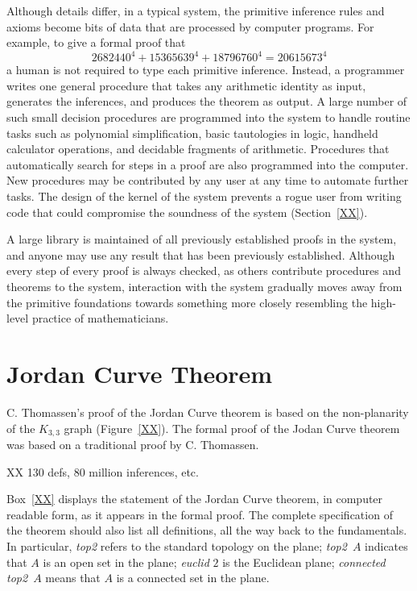 \documentclass{llncs}
\begin{document}
Although details differ, 
in a typical system, the primitive inference rules and axioms
become bits of data that are processed by computer programs.
For example, to give a formal proof that 
$$
2682440^4 + 15365639^4 + 18796760^4 = 20615673^4
$$
a human is not required to type each primitive inference.  Instead,
a programmer writes one general procedure that takes any arithmetic
identity as input,  generates the inferences,
and produces the theorem as output.   A large number of such
small decision procedures are programmed into the system to handle
routine tasks such as polynomial simplification, basic tautologies in logic,
handheld calculator operations, 
and decidable fragments of arithmetic.  
Procedures that automatically search for steps in a proof
are also programmed into the computer.  
New procedures may be contributed
by any user at any time to automate further tasks.
The design of the kernel of the system prevents a rogue
user from writing code that could compromise the soundness of the system (Section~\ref{XX}).


A large library is maintained
of all previously established proofs in the system, and anyone may
use any result that has been previously established.
 Although every step of every proof is
always checked,
as others contribute procedures and theorems to the system,
interaction with the system gradually moves
away from the primitive foundations towards something more closely
resembling the high-level practice of mathematicians.


\section{Jordan Curve Theorem}

C. Thomassen's proof of the Jordan Curve theorem is based
on the non-planarity of the $K_{3,3}$ graph (Figure~\ref{XX}).
The formal proof of the Jodan Curve theorem was based on 
a traditional proof by C. Thomassen.  

XX 130 defs, 80 million inferences, etc.

Box~\ref{XX} displays the statement of the Jordan Curve theorem, in computer
readable form, as it appears in the formal
proof.  The complete specification of the theorem should also list
all definitions, all the way back to the fundamentals.  In particular, {\it top2} refers
to the standard topology on the plane; {\it top2}~$A$ indicates that $A$ is an open set
in the plane;  {\it euclid} $2$ is the Euclidean plane; {\it connected top2}~$A$ means that
$A$ is a connected set in the plane.
\end{document}

